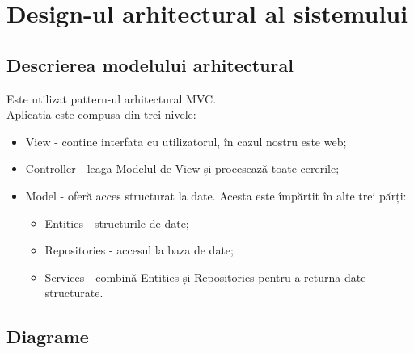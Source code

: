 \documentclass[11pt,a4paper,twoside,notitlepage]{article}
\begin{document}
\section{Design-ul arhitectural al sistemului}

\subsection{Descrierea modelului arhitectural}
Este utilizat pattern-ul arhitectural MVC.\\
Aplicatia este compusa din trei nivele: 
\begin{itemize}
	\item View - contine interfata cu utilizatorul, în cazul nostru este web; 
	\item Controller - leaga Modelul de View și procesează toate cererile;
	\item Model - oferă acces structurat la date. Acesta este împărtit în alte trei părți:
																	\begin{itemize}
																		\item Entities - structurile de date;
																		\item Repositories - accesul la baza de date;
																		\item Services - combină Entities și Repositories pentru a returna date structurate.
																	\end{itemize}
\end{itemize}

\subsection{Diagrame}
\end{document}
